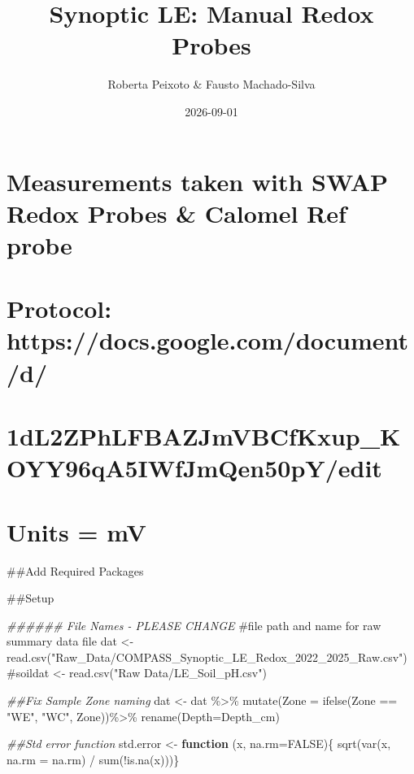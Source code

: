 \documentclass[
  letterpaper,
  DIV=11,
  numbers=noendperiod]{scrartcl}
\title{Synoptic LE: Manual Redox Probes}
\author{Roberta Peixoto \& Fausto Machado-Silva}
\date{2026-09-01}
\newenvironment{Shaded}{\begin{snugshade}}{\end{snugshade}}
\newcommand{\AttributeTok}[1]{\textcolor[rgb]{0.40,0.45,0.13}{#1}}
\newcommand{\CommentTok}[1]{\textcolor[rgb]{0.37,0.37,0.37}{#1}}
\newcommand{\ConstantTok}[1]{\textcolor[rgb]{0.56,0.35,0.01}{#1}}
\newcommand{\ControlFlowTok}[1]{\textcolor[rgb]{0.00,0.23,0.31}{\textbf{#1}}}
\newcommand{\DocumentationTok}[1]{\textcolor[rgb]{0.37,0.37,0.37}{\textit{#1}}}
\newcommand{\FunctionTok}[1]{\textcolor[rgb]{0.28,0.35,0.67}{#1}}
\newcommand{\NormalTok}[1]{\textcolor[rgb]{0.00,0.23,0.31}{#1}}
\newcommand{\OtherTok}[1]{\textcolor[rgb]{0.00,0.23,0.31}{#1}}
\newcommand{\SpecialCharTok}[1]{\textcolor[rgb]{0.37,0.37,0.37}{#1}}
\newcommand{\StringTok}[1]{\textcolor[rgb]{0.13,0.47,0.30}{#1}}
\renewcommand*\contentsname{Table of contents}
\newcommand\contentsname{Table of contents}
\begin{document}
\maketitle

\renewcommand*\contentsname{Table of contents}
{
\hypersetup{linkcolor=}
\setcounter{tocdepth}{3}
\tableofcontents
}

\section{Measurements taken with SWAP Redox Probes \& Calomel Ref
probe}\label{measurements-taken-with-swap-redox-probes-calomel-ref-probe}

\section{Protocol:
https://docs.google.com/document/d/}\label{protocol-httpsdocs.google.comdocumentd}

\section{1dL2ZPhLFBAZJmVBCfKxup\_KOYY96qA5IWfJmQen50pY/edit}\label{dl2zphlfbazjmvbcfkxup_koyy96qa5iwfjmqen50pyedit}

\section{Units = mV}\label{units-mv}

\#\#Add Required Packages

\#\#Setup

\begin{Shaded}
\begin{Highlighting}[]
\DocumentationTok{\#\#\#\#\#\# File Names {-} PLEASE CHANGE }
\CommentTok{\#file path and name for raw summary data file }
\NormalTok{dat }\OtherTok{\textless{}{-}} \FunctionTok{read.csv}\NormalTok{(}\StringTok{"Raw\_Data/COMPASS\_Synoptic\_LE\_Redox\_2022\_2025\_Raw.csv"}\NormalTok{)}
\CommentTok{\#soildat \textless{}{-} read.csv("Raw Data/LE\_Soil\_pH.csv") }

\DocumentationTok{\#\#Fix Sample Zone naming}
\NormalTok{dat }\OtherTok{\textless{}{-}}\NormalTok{ dat }\SpecialCharTok{\%\textgreater{}\%}
  \FunctionTok{mutate}\NormalTok{(}\AttributeTok{Zone =} \FunctionTok{ifelse}\NormalTok{(Zone }\SpecialCharTok{==} \StringTok{"WE"}\NormalTok{, }\StringTok{"WC"}\NormalTok{, Zone))}\SpecialCharTok{\%\textgreater{}\%}
  \FunctionTok{rename}\NormalTok{(}\AttributeTok{Depth=}\NormalTok{Depth\_cm)}

\DocumentationTok{\#\#Std error function}
\NormalTok{std.error }\OtherTok{\textless{}{-}} \ControlFlowTok{function}\NormalTok{ (x, }\AttributeTok{na.rm=}\ConstantTok{FALSE}\NormalTok{)\{}
  \FunctionTok{sqrt}\NormalTok{(}\FunctionTok{var}\NormalTok{(x, }\AttributeTok{na.rm =}\NormalTok{ na.rm) }\SpecialCharTok{/} \FunctionTok{sum}\NormalTok{(}\SpecialCharTok{!}\FunctionTok{is.na}\NormalTok{(x)))\}}
\end{Highlighting}
\end{Shaded}
\end{document}
